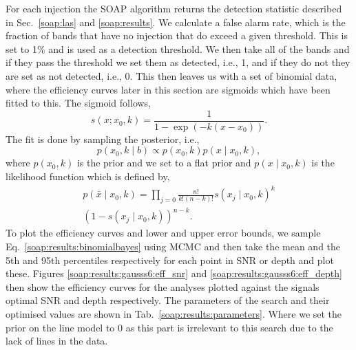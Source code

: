 %
%
For each injection the SOAP algorithm returns the detection statistic described in Sec.~\ref{soap:las} and \ref{soap:results}.
We calculate a false alarm rate, which is the fraction of bands that have no injection that do exceed a given threshold. This is set to 1\% and is used as a detection threshold.
We then take all of the bands and if they pass the threshold we set them as detected, i.e., 1, and if they do not they are set as not detected, i.e., 0.
This then leaves us with a set of binomial data, where the efficiency curves later in this section are sigmoids which have been fitted to this.
The sigmoid follows,
\begin{equation}
s(x; x_0, k)  = \frac{1}{1-\exp{(-k(x - x_0))}}.
\end{equation}
The fit is done by sampling the posterior, i.e.,
\begin{equation}
\label{soap:results:binomialbayes}
p(x_0, k \mid b) \propto  p(x_0,k)p(x \mid x_0, k),
\end{equation}
where $p(x_0,k)$ is the prior and we set to a flat prior and $p(x \mid x_0, k)$ is the likelihood function which is defined by,
\begin{equation}
\begin{split}
p(\bar{x} \mid x_0, k) = \prod_{j=0}\frac{n!}{k!(n-k)!}s(x_j \mid x_0, k)^{k} \\ (1-s(x_j \mid x_0,k))^{n-k}.
\end{split}
\end{equation}
To plot the efficiency curves and lower and upper error bounds, we sample Eq.~\ref{soap:results:binomialbayes} using \gls{MCMC} and then take the mean and the 5th and 95th percentiles respectively for each point in SNR or depth and plot these.
Figures \ref{soap:results:gausss6:eff_snr} and \ref{soap:results:gausss6:eff_depth} then show the efficiency curves for the analyses plotted against the signals optimal \gls{SNR} and depth respectively.
The parameters of the search and their optimised values are shown in Tab.~\ref{soap:results:parameters}. Where we set the prior on the line model to 0 as this part is irrelevant to this search due to the lack of lines in the data.

